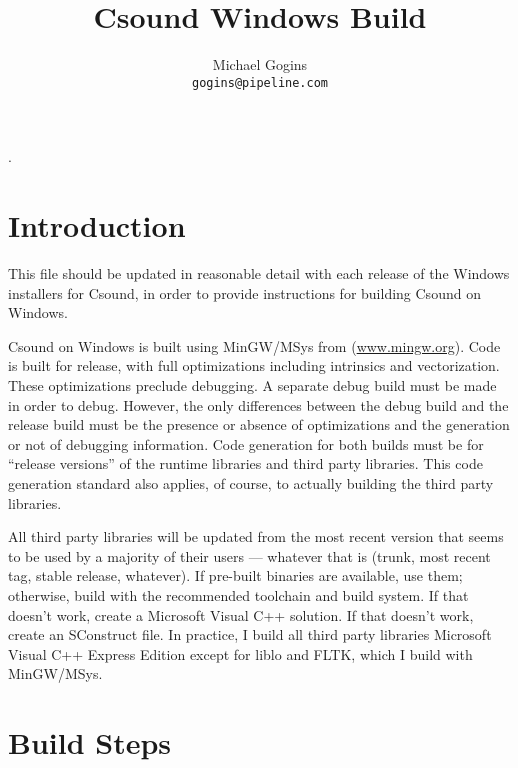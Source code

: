\documentclass[11pt,letterpaper,onecolumn]{scrartcl}
\begin{document}
\begin{sloppypar}

.
\title{Csound Windows Build}
\author{Michael Gogins \\ \texttt{gogins@pipeline.com}}
\maketitle

\section{Introduction}
\label{sec:Introduction}


This file should be updated in reasonable detail with each release of the Windows installers for Csound, in order to provide instructions for building Csound on Windows.

Csound on Windows is built using MinGW/MSys from (\url{www.mingw.org}). Code is built for release, with full optimizations including intrinsics and vectorization. These optimizations preclude debugging. A separate debug build must be made in order to debug. However, the only differences between the debug build and the release build must be the presence or absence of optimizations and the generation or not of debugging information. Code generation for both builds must be for ``release versions'' of the runtime libraries and third party libraries. This code generation standard also applies, of course, to actually building the third party libraries.

All third party libraries will be updated from the most recent version that seems to be used by a majority of their users --- whatever that is (trunk, most recent tag, stable release, whatever). If pre-built binaries are available, use them; otherwise, build with the recommended toolchain and build system. If that doesn't work, create a Microsoft Visual C++ solution. If that doesn't work, create an SConstruct file. In practice, I build all third party libraries Microsoft Visual C++ Express Edition except for liblo and FLTK, which I build with MinGW/MSys.

\section{Build Steps}
\label{sec:BuildSteps}


\end{sloppypar}
\end{document}
